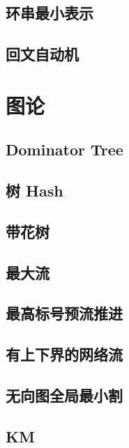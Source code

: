 \documentclass[landscape, twocolumn, 8pt, a4paper, twoside]{extarticle}
\begin{document}
\subsection{环串最小表示}

\subsection{回文自动机}


\section{图论}
\subsection{Dominator Tree}


\subsection{树 Hash}


\subsection{带花树}


\subsection{最大流}


\subsection{最高标号预流推进}


\subsection{有上下界的网络流}

\subsection{无向图全局最小割}
\subsection{KM}

\end{document}
